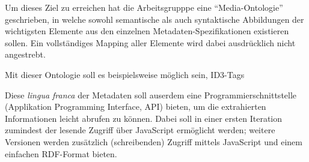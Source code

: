 	Um dieses Ziel zu erreichen hat die Arbeitsgrupppe eine \enquote{Media-Ontologie} geschrieben, in welche sowohl semantische als auch syntaktische Abbildungen der wichtigsten Elemente aus den einzelnen Metadaten-Spezifikationen existieren sollen. Ein vollständiges Mapping aller Elemente wird dabei ausdrücklich nicht angestrebt.
	
	Mit dieser Ontologie soll es beispielsweise möglich sein, ID3-Tags %
	
	Diese \emph{lingua franca} der Metadaten soll auserdem eine Programmierschnittstelle (Applikation Programming Interface, API) bieten, um die extrahierten Informationen leicht abrufen zu können. Dabei soll in einer ersten Iteration zumindest der lesende Zugriff über JavaScript ermöglicht werden; weitere Versionen werden zusätzlich (schreibenden) Zugriff mittels JavaScript und einem einfachen RDF-Format bieten.
	
	
	
